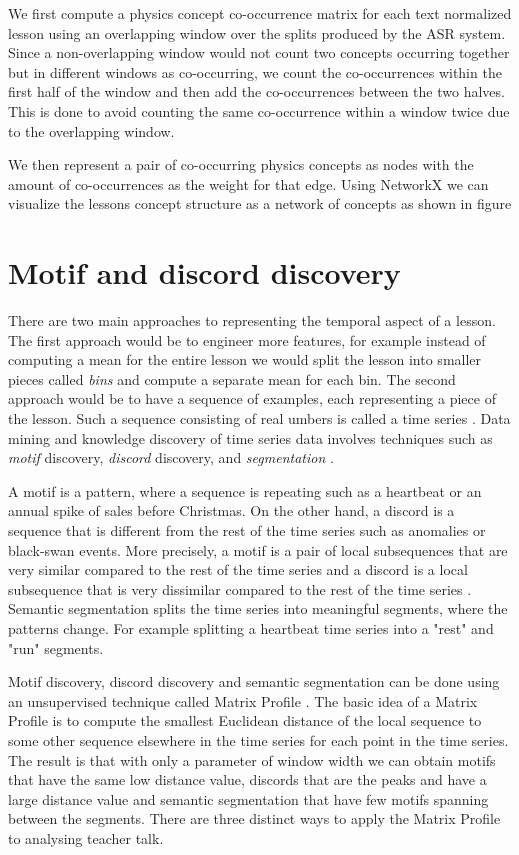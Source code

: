 \documentclass[utf8,english]{gradu3}
\begin{document}
We first compute a physics concept co-occurrence matrix for each text normalized lesson using an overlapping window over the splits produced by the ASR system. Since a non-overlapping window would not count two concepts occurring together but in different windows as co-occurring, we count the co-occurrences within the first half of the window and then add the co-occurrences between the two halves. This is done to avoid counting the same co-occurrence within a window twice due to the overlapping window.

We then represent a pair of co-occurring physics concepts as nodes with the amount of co-occurrences as the weight for that edge. Using NetworkX \parencite{hagbergExploringNetworkStructure2008} we can visualize the lessons concept structure as a network of concepts as shown in figure %

\section{Motif and discord discovery}
There are two main approaches to representing the temporal aspect of a lesson. The first approach would be to engineer more features, for example instead of computing a mean for the entire lesson we would split the lesson into smaller pieces called \emph{bins} and compute a separate mean for each bin. The second approach would be to have a sequence of examples, each representing a piece of the lesson. Such a sequence consisting of real umbers is called a time series \parencite{yehMatrixProfileVI2017}. Data mining and knowledge discovery of time series data involves techniques such as \emph{motif} discovery, \emph{discord} discovery, and \emph{segmentation} \parencite{yehUniversalTimeSeries2018}.

A motif is a pattern, where a sequence is repeating such as a heartbeat or an annual spike of sales before Christmas. On the other hand, a discord is a sequence that is different from the rest of the time series such as anomalies or black-swan events. More precisely, a motif is a pair of local subsequences that are very similar compared to the rest of the time series and a discord is a local subsequence that is very dissimilar compared to the rest of the time series \parencite{yehUniversalTimeSeries2018}. Semantic segmentation splits the time series into meaningful segments, where the patterns change. For example splitting a heartbeat time series into a "rest" and "run" segments.

Motif discovery, discord discovery and semantic segmentation can be done using an unsupervised technique called Matrix Profile \parencite{yehUniversalTimeSeries2018}. The basic idea of a Matrix Profile is to compute the smallest Euclidean distance of the local sequence to some other sequence elsewhere in the time series for each point in the time series. The result is that with only a parameter of window width we can obtain motifs that have the same low distance value, discords that are the peaks and have a large distance value and semantic segmentation that have few motifs spanning between the segments. There are three distinct ways to apply the Matrix Profile to analysing teacher talk.
\end{document}
